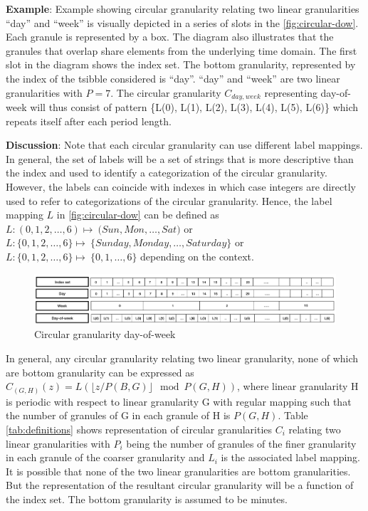 \documentclass[12pt]{article}
\begin{document}
\textbf{Example}: Example showing circular granularity relating two linear granularities ``day'' and ``week'' is visually depicted in a series of slots in the \autoref{fig:circular-dow}. Each granule is represented by a box. The diagram also illustrates that the granules that overlap share elements from the underlying time domain. The first slot in the diagram shows the index set. The bottom granularity, represented by the index of the tsibble considered is ``day''. ``day'' and ``week'' are two linear granularities with \(P = 7\). The circular granularity \(C_{day, week}\) representing day-of-week will thus consist of pattern \{L(0), L(1), L(2), L(3), L(4), L(5), L(6)\} which repeats itself after each period length.

\textbf{Discussion}: Note that each circular granularity can use different label mappings. In general, the set of labels will be a set of strings that is more descriptive than the index and used to identify a categorization of the circular granularity. However, the labels can coincide with indexes in which case integers are directly used to refer to categorizations of the circular granularity. Hence, the label mapping \(L\) in \autoref{fig:circular-dow} can be defined as \(L: ({0,1,2, \dots, 6}) \longmapsto\ ({Sun, Mon, \dots, Sat)}\) or \(L: \{0,1,2, \dots, 6\} \longmapsto\ \{Sunday, Monday, \dots, Saturday\}\) or \(L: \{0,1,2, \dots, 6\} \longmapsto\ \{0, 1, \dots, 6\}\) depending on the context.

\begin{figure}

{\centering \includegraphics[width=1\linewidth]{Figs/circular-dow} 

}

\caption{Circular granularity day-of-week}\label{fig:circular-dow}
\end{figure}

In general, any circular granularity relating two linear granularity, none of which are bottom granularity can be expressed as \(C_{(G, H)}(z) = L(\lfloor z/P(B,G) \rfloor\mod P(G,H))\), where linear granularity H is periodic with respect to linear granularity G with regular mapping such that the number of granules of G in each granule of H is \(P(G,H)\). Table \ref{tab:definitions} shows representation of circular granularities \(C_i\) relating two linear granularities with \(P_i\) being the number of granules of the finer granularity in each granule of the coarser granularity and \(L_i\) is the associated label mapping. It is possible that none of the two linear granularities are bottom granularities. But the representation of the resultant circular granularity will be a function of the index set. The bottom granularity is assumed to be minutes.
\end{document}
